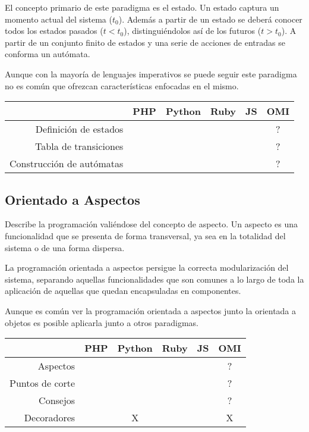 El concepto primario de este paradigma es el estado. Un estado captura 
un momento actual del sistema ($t_0$). Además a partir de un estado se 
deberá conocer todos los estados pasados ($t < t_0$), distinguiéndolos 
así de los futuros ($ t > t_0$). A partir de un conjunto finito 
de estados y una serie de acciones de entradas se conforma un 
autómata.

Aunque con la mayoría de lenguajes imperativos se puede seguir este paradigma no es 
común que ofrezcan características enfocadas en el mismo.

\FloatBarrier
\begin{table}[h]
\begin{center}
 
\begin{tabular}{|r|c|c|c|c|c|} \hline
 & PHP  & Python & Ruby & JS & OMI\\ \hline
Definición de estados & & & &  & ? \\ \hline
Tabla de transiciones & & & &  & ? \\ \hline
Construcción de autómatas & & & &  & ? \\ \hline
\end{tabular}
\end{center}
\end{table}
\FloatBarrier

\subsection{Orientado a Aspectos}

Describe la programación valiéndose del concepto de aspecto. Un aspecto es una
funcionalidad que se presenta de forma transversal, ya sea en la totalidad 
del sistema o de una forma dispersa. 

La programación orientada a aspectos persigue la correcta modularización del sistema, separando
aquellas funcionalidades que son comunes a lo largo de toda la aplicación de aquellas
que quedan encapsuladas en componentes. 

Aunque es común ver la programación orientada a aspectos junto la orientada a objetos es posible 
aplicarla junto a otros paradigmas. 

\FloatBarrier
\begin{table}[h]
\begin{center}
 
\begin{tabular}{|r|c|c|c|c|c|} \hline
 & PHP  & Python & Ruby & JS & OMI\\ \hline
Aspectos &  &  &  &  & ? \\ \hline
Puntos de corte & &  &  &  & ? \\ \hline
Consejos   & & & & & ? \\ \hline
Decoradores   & & X & & & X \\ \hline
\end{tabular}
\end{center}
\end{table}
\FloatBarrier

